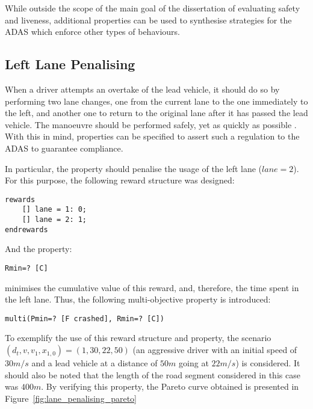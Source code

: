 While outside the scope of the main goal of the dissertation of evaluating safety and liveness, additional properties can be used to synthesise strategies for the ADAS which enforce other types of behaviours. 

\subsection{Left Lane Penalising}

When a driver attempts an overtake of the lead vehicle, it should do so by performing two lane changes, one from the current lane to the one immediately to the left, and another one to return to the original lane after it has passed the lead vehicle. The manoeuvre should be performed safely, yet as quickly as possible \cite{carr}. With this in mind, properties can be specified to assert such a regulation to the ADAS to guarantee compliance.

In particular, the property should penalise the usage of the left lane ($lane = 2$). For this purpose, the following reward structure was designed:

\begin{minipage}{\linewidth}
{\vspace{1em}
\begin{lstlisting}
rewards
	[] lane = 1: 0;
	[] lane = 2: 1;
endrewards
\end{lstlisting}
}
\end{minipage}

And the property:

\begin{minipage}{\linewidth}
{\vspace{1em}
\begin{lstlisting}
Rmin=? [C]
\end{lstlisting}
}
\end{minipage}

minimises the cumulative value of this reward, and, therefore, the time spent in the left lane. Thus, the following multi-objective property is introduced:

\begin{minipage}{\linewidth}
{\vspace{1em}
\begin{lstlisting}
multi(Pmin=? [F crashed], Rmin=? [C])
\end{lstlisting}
}
\end{minipage}

To exemplify the use of this reward structure and property, the scenario $(d_t, v, v_1, x_{1,0}) = (1, 30, 22, 50)$ (an aggressive driver with an initial speed of $30m/s$ and a lead vehicle at a distance of $50m$ going at $22m/s$) is considered. It should also be noted that the length of the road segment considered in this case was $400m$. By verifying this property, the Pareto curve obtained is presented in Figure~\ref{fig:lane_penalising_pareto}

